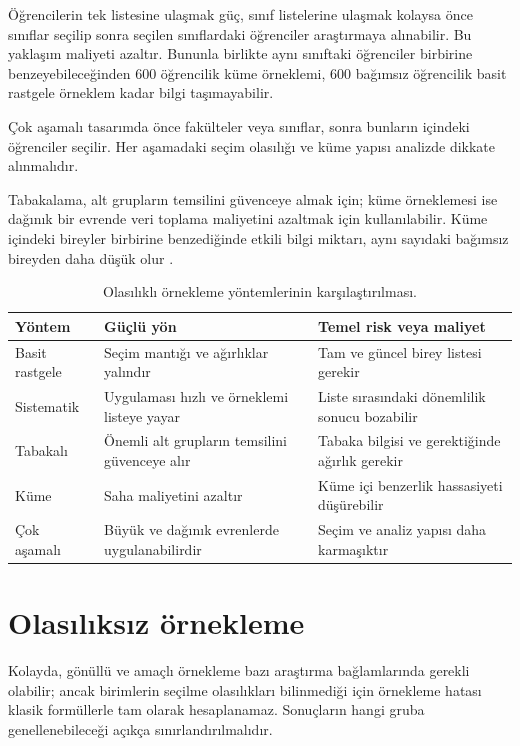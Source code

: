 Öğrencilerin tek listesine ulaşmak güç, sınıf listelerine ulaşmak kolaysa önce
sınıflar seçilip sonra seçilen sınıflardaki öğrenciler araştırmaya alınabilir.
Bu yaklaşım maliyeti azaltır. Bununla birlikte aynı sınıftaki öğrenciler
birbirine benzeyebileceğinden 600 öğrencilik küme örneklemi, 600 bağımsız
öğrencilik basit rastgele örneklem kadar bilgi taşımayabilir.

Çok aşamalı tasarımda önce fakülteler veya sınıflar, sonra bunların içindeki
öğrenciler seçilir. Her aşamadaki seçim olasılığı ve küme yapısı analizde
dikkate alınmalıdır.

Tabakalama, alt grupların temsilini güvenceye almak için; küme örneklemesi ise
dağınık bir evrende veri toplama maliyetini azaltmak için kullanılabilir.
Küme içindeki bireyler birbirine benzediğinde etkili bilgi miktarı, aynı
sayıdaki bağımsız bireyden daha düşük olur \cite{chambers2003}.

\begin{table}[htbp]
\centering
\caption{Olasılıklı örnekleme yöntemlerinin karşılaştırılması.}
\begin{tabular}{@{}p{}p{}p{}@{}}
\toprule
Yöntem & Güçlü yön & Temel risk veya maliyet \\
\midrule
Basit rastgele & Seçim mantığı ve ağırlıklar yalındır & Tam ve güncel birey listesi gerekir \\
Sistematik & Uygulaması hızlı ve örneklemi listeye yayar & Liste sırasındaki dönemlilik sonucu bozabilir \\
Tabakalı & Önemli alt grupların temsilini güvenceye alır & Tabaka bilgisi ve gerektiğinde ağırlık gerekir \\
Küme & Saha maliyetini azaltır & Küme içi benzerlik hassasiyeti düşürebilir \\
Çok aşamalı & Büyük ve dağınık evrenlerde uygulanabilirdir & Seçim ve analiz yapısı daha karmaşıktır \\
\bottomrule
\end{tabular}
\end{table}

\section{Olasılıksız örnekleme}

Kolayda, gönüllü ve amaçlı örnekleme bazı araştırma bağlamlarında gerekli
olabilir; ancak birimlerin seçilme olasılıkları bilinmediği için örnekleme
hatası klasik formüllerle tam olarak hesaplanamaz. Sonuçların hangi gruba
genellenebileceği açıkça sınırlandırılmalıdır.

